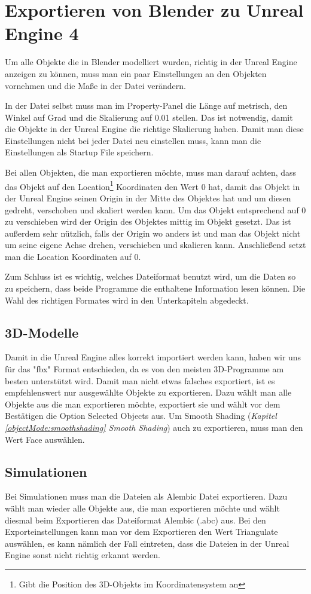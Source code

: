 \section{Exportieren von Blender zu Unreal Engine 4}
\label{Exportieren_von_Blender_zu_Unreal_Engine_4:ref1}
Um alle Objekte die in Blender modelliert wurden, richtig in der Unreal Engine anzeigen zu können, muss man ein paar
Einstellungen an den Objekten vornehmen und die Maße in der Datei verändern.

In der Datei selbst muss man im Property-Panel die Länge auf metrisch, den Winkel auf Grad und die Skalierung auf 0.01 stellen.
Das ist notwendig, damit die Objekte in der Unreal Engine die richtige Skalierung haben. Damit man diese Einstellungen nicht bei
jeder Datei neu einstellen muss, kann man die Einstellungen als Startup File speichern.

Bei allen Objekten, die man exportieren möchte, muss man darauf achten, dass das Objekt auf den Location\footnote{Gibt die Position des 3D-Objekts im Koordinatensystem an} Koordinaten
den Wert 0 hat, damit das Objekt in der Unreal Engine seinen Origin in der Mitte des Objektes hat und um diesen gedreht, verschoben und skaliert werden kann.
Um das Objekt entsprechend auf 0 zu verschieben wird der Origin des Objektes mittig im Objekt gesetzt. Das ist außerdem sehr nützlich, falls der Origin wo anders ist und man das
Objekt nicht um seine eigene Achse drehen, verschieben und skalieren kann. Anschließend setzt man die Location Koordinaten auf 0.

Zum Schluss ist es wichtig, welches Dateiformat benutzt wird, um die Daten so zu speichern, dass beide Programme die enthaltene
Information lesen können. Die Wahl des richtigen Formates wird in den Unterkapiteln abgedeckt.

\subsection{3D-Modelle}
Damit in die Unreal Engine alles korrekt importiert werden kann, haben wir uns für das "fbx" Format entschieden, da es von den meisten 3D-Programme am besten unterstützt wird.
Damit man nicht etwas falsches exportiert, ist es empfehlenswert nur ausgewählte Objekte zu exportieren. Dazu wählt man alle
Objekte aus die man exportieren möchte, exportiert sie und wählt vor dem Bestätigen die Option Selected Objects aus.
Um Smooth Shading (\textit{Kapitel \ref{objectMode:smoothshading} \dq Smooth Shading\dq})
auch zu exportieren, muss man den Wert Face auswählen.

\subsection{Simulationen}
\label{Simulation_Heading}
Bei Simulationen muss man die Dateien als Alembic Datei exportieren. Dazu wählt man wieder alle Objekte aus, die man exportieren möchte und
wählt diesmal beim Exportieren das Dateiformat Alembic (.abc) aus. Bei den Exporteinstellungen kann man vor dem Exportieren den Wert Triangulate auswählen,
es kann nämlich der Fall eintreten, dass die Dateien in der Unreal Engine sonst nicht richtig erkannt werden.